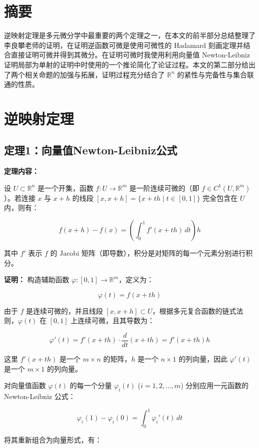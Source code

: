 \documentclass[12pt,a4paper]{ctexart}
\begin{document}
\section*{摘要}

逆映射定理是多元微分学中最重要的两个定理之一，在本文的前半部分总结整理了李良攀老师的证明，在证明逆函数可微是使用可微性的 Hadamard 刻画定理并结合直接证明可微并得到其微分。在证明可微时我使用利用向量值 Newton-Leibniz 证明局部为单射的证明中时使用的一个推论简化了论证过程。本文的第二部分给出了两个相关命题的加强与拓展，证明过程充分结合了 $\mathbb{R}^n$ 的紧性与完备性与集合联通的性质。

\section*{逆映射定理}

\subsection*{定理1：向量值Newton-Leibniz公式}

\textbf{定理内容：}

设 $U \subset \mathbb{R}^n$ 是一个开集，函数 $f: U \to \mathbb{R}^m$ 是一阶连续可微的（即 $f \in C^1(U, \mathbb{R}^m)$）。若连接 $x$ 与 $x+h$ 的线段 $[x, x+h] = \{x + th \mid t \in [0, 1]\}$ 完全包含在 $U$ 内，则有：

\[
f(x+h) - f(x) = \left( \int_0^1 f'(x+th) \, dt \right) h
\]

其中 $f'$ 表示 $f$ 的 Jacobi 矩阵（即导数），积分是对矩阵的每一个元素分别进行积分。

\textbf{证明：}
构造辅助函数 $\varphi: [0, 1] \to \mathbb{R}^m$，定义为：

\[
\varphi(t) = f(x+th)
\]

由于 $f$ 是连续可微的，并且线段 $[x, x+h] \subset U$，根据多元复合函数的链式法则，$\varphi(t)$ 在 $[0, 1]$ 上连续可微，且其导数为：

\[
\varphi'(t) = f'(x+th) \cdot \frac{d}{dt}(x+th) = f'(x+th)h
\]

这里 $f'(x+th)$ 是一个 $m \times n$ 的矩阵，$h$ 是一个 $n \times 1$ 的列向量，因此 $\varphi'(t)$ 是一个 $m \times 1$ 的列向量。

对向量值函数 $\varphi(t)$ 的每一个分量 $\varphi_i(t)$ ($i = 1, 2, \dots, m$) 分别应用一元函数的 Newton-Leibniz 公式：

\[
\varphi_i(1) - \varphi_i(0) = \int_0^1 \varphi_i'(t) \, dt
\]

将其重新组合为向量形式，有：
\end{document}
